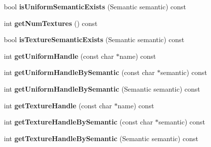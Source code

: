 \begin{DoxyCompactItemize}
\item 
bool {\bfseries is\+Uniform\+Semantic\+Exists} (Semantic semantic) const \hypertarget{class_i_dream_sky_1_1_visual_effect_a49f472caf85fc12e50f760351d88979e}{}\label{class_i_dream_sky_1_1_visual_effect_a49f472caf85fc12e50f760351d88979e}

\item 
int {\bfseries get\+Num\+Textures} () const \hypertarget{class_i_dream_sky_1_1_visual_effect_a121cbbb66895b72a28629018d3183135}{}\label{class_i_dream_sky_1_1_visual_effect_a121cbbb66895b72a28629018d3183135}

\item 
bool {\bfseries is\+Texture\+Semantic\+Exists} (Semantic semantic) const \hypertarget{class_i_dream_sky_1_1_visual_effect_a89217c847d6da54f695be16a5cd380e8}{}\label{class_i_dream_sky_1_1_visual_effect_a89217c847d6da54f695be16a5cd380e8}

\item 
int {\bfseries get\+Uniform\+Handle} (const char $\ast$name) const \hypertarget{class_i_dream_sky_1_1_visual_effect_a11c2a56182b50acc70e1439ed9762866}{}\label{class_i_dream_sky_1_1_visual_effect_a11c2a56182b50acc70e1439ed9762866}

\item 
int {\bfseries get\+Uniform\+Handle\+By\+Semantic} (const char $\ast$semantic) const \hypertarget{class_i_dream_sky_1_1_visual_effect_ad5d704d0d6c97d3cb1677f45ebfa6246}{}\label{class_i_dream_sky_1_1_visual_effect_ad5d704d0d6c97d3cb1677f45ebfa6246}

\item 
int {\bfseries get\+Uniform\+Handle\+By\+Semantic} (Semantic semantic) const \hypertarget{class_i_dream_sky_1_1_visual_effect_aca80cfbfe9edeb66f4a7081d0634ffd0}{}\label{class_i_dream_sky_1_1_visual_effect_aca80cfbfe9edeb66f4a7081d0634ffd0}

\item 
int {\bfseries get\+Texture\+Handle} (const char $\ast$name) const \hypertarget{class_i_dream_sky_1_1_visual_effect_a8ce776bb080171791598c271ca458bf5}{}\label{class_i_dream_sky_1_1_visual_effect_a8ce776bb080171791598c271ca458bf5}

\item 
int {\bfseries get\+Texture\+Handle\+By\+Semantic} (const char $\ast$semantic) const \hypertarget{class_i_dream_sky_1_1_visual_effect_a4c45b4ad5c6083c996e2f72d752a02a1}{}\label{class_i_dream_sky_1_1_visual_effect_a4c45b4ad5c6083c996e2f72d752a02a1}

\item 
int {\bfseries get\+Texture\+Handle\+By\+Semantic} (Semantic semantic) const \hypertarget{class_i_dream_sky_1_1_visual_effect_a8b78f057f6c0b24f3a1160884c0ff90a}{}\label{class_i_dream_sky_1_1_visual_effect_a8b78f057f6c0b24f3a1160884c0ff90a}


\end{DoxyCompactItemize}
